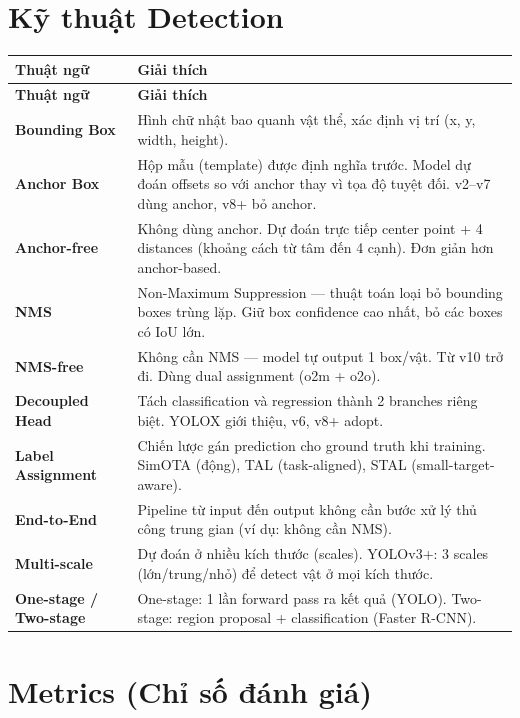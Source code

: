 \documentclass[12pt,a4paper]{report}
\begin{document}
\section*{Kỹ thuật Detection}

\begin{longtable}{p{3.5cm}p{12cm}}
\toprule
\textbf{Thuật ngữ} & \textbf{Giải thích} \\
\midrule
\endfirsthead
\toprule
\textbf{Thuật ngữ} & \textbf{Giải thích} \\
\midrule
\endhead

\textbf{Bounding Box} & Hình chữ nhật bao quanh vật thể, xác định vị trí (x, y, width, height). \\
\midrule
\textbf{Anchor Box} & Hộp mẫu (template) được định nghĩa trước. Model dự đoán offsets so với anchor thay vì tọa độ tuyệt đối. v2--v7 dùng anchor, v8+ bỏ anchor. \\
\midrule
\textbf{Anchor-free} & Không dùng anchor. Dự đoán trực tiếp center point + 4 distances (khoảng cách từ tâm đến 4 cạnh). Đơn giản hơn anchor-based. \\
\midrule
\textbf{NMS} & Non-Maximum Suppression --- thuật toán loại bỏ bounding boxes trùng lặp. Giữ box confidence cao nhất, bỏ các boxes có IoU lớn. \\
\midrule
\textbf{NMS-free} & Không cần NMS --- model tự output 1 box/vật. Từ v10 trở đi. Dùng dual assignment (o2m + o2o). \\
\midrule
\textbf{Decoupled Head} & Tách classification và regression thành 2 branches riêng biệt. YOLOX giới thiệu, v6, v8+ adopt. \\
\midrule
\textbf{Label Assignment} & Chiến lược gán prediction cho ground truth khi training. SimOTA (động), TAL (task-aligned), STAL (small-target-aware). \\
\midrule
\textbf{End-to-End} & Pipeline từ input đến output không cần bước xử lý thủ công trung gian (ví dụ: không cần NMS). \\
\midrule
\textbf{Multi-scale} & Dự đoán ở nhiều kích thước (scales). YOLOv3+: 3 scales (lớn/trung/nhỏ) để detect vật ở mọi kích thước. \\
\midrule
\textbf{One-stage / Two-stage} & One-stage: 1 lần forward pass ra kết quả (YOLO). Two-stage: region proposal + classification (Faster R-CNN). \\
\bottomrule
\end{longtable}

\section*{Metrics (Chỉ số đánh giá)}
\end{document}
